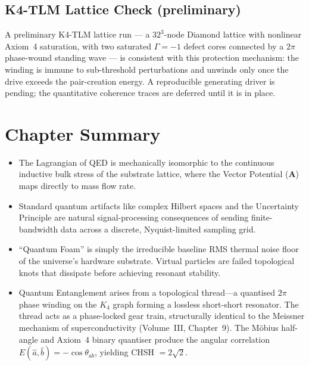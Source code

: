\subsection{K4-TLM Lattice Check (preliminary)}
\label{subsec:k4tlm_entanglement}
A preliminary K4-TLM lattice run --- a $32^3$-node Diamond lattice with nonlinear Axiom~4 saturation, with two saturated $\Gamma = -1$\gammaundeclared{} defect cores connected by a $2\pi$ phase-wound standing wave --- is consistent with this protection mechanism: the winding is immune to sub-threshold perturbations and unwinds only once the drive exceeds the pair-creation energy. A reproducible generating driver is pending; the quantitative coherence traces are deferred until it is in place.

\section*{Chapter Summary}
\begin{itemize}
    \item The Lagrangian of QED is mechanically isomorphic to the continuous inductive bulk stress of the substrate lattice, where the Vector Potential ($\mathbf{A}$) maps directly to mass flow rate.
    \item Standard quantum artifacts like complex Hilbert spaces and the Uncertainty Principle are natural signal-processing consequences of sending finite-bandwidth data across a discrete, Nyquist-limited sampling grid.
    \item ``Quantum Foam'' is simply the irreducible baseline RMS thermal noise floor of the universe's hardware substrate. Virtual particles are failed topological knots that dissipate before achieving resonant stability.
    \item Quantum Entanglement arises from a topological thread---a quantised $2\pi$ phase winding on the $K_4$ graph forming a lossless short-short resonator. The thread acts as a phase-locked gear train, structurally identical to the Meissner mechanism of superconductivity (Volume~III, Chapter~9). The M\"obius half-angle and Axiom~4 binary quantiser produce the angular correlation $E(\hat{a},\hat{b}) = -\cos\theta_{ab}$, yielding CHSH $= 2\sqrt{2}$.
\end{itemize}

